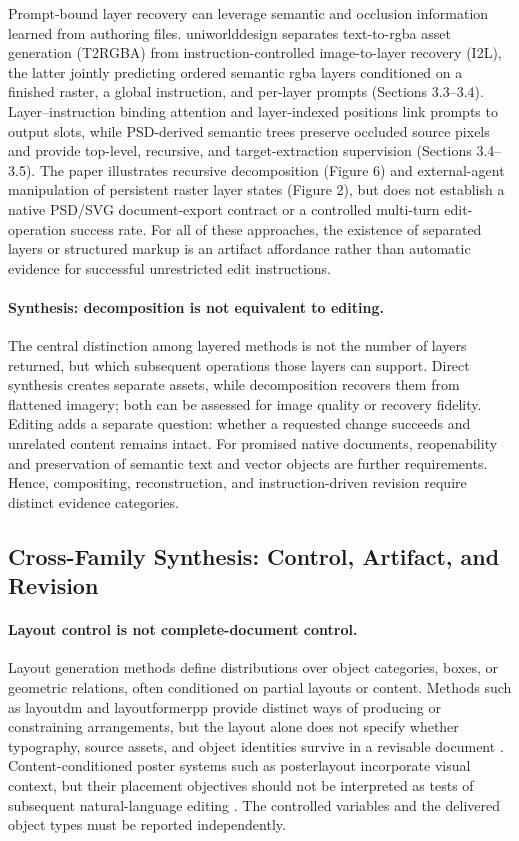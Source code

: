 Prompt-bound layer recovery can leverage semantic and occlusion information learned from authoring files.
\ac{uniworlddesign} separates text-to-\ac{rgba} asset generation (T2RGBA) from instruction-controlled image-to-layer recovery (I2L), the latter jointly predicting ordered semantic \ac{rgba} layers conditioned on a finished raster, a global instruction, and per-layer prompts (Sections 3.3--3.4).
Layer--instruction binding attention and layer-indexed positions link prompts to output slots, while PSD-derived semantic trees preserve occluded source pixels and provide top-level, recursive, and target-extraction supervision (Sections 3.4--3.5).
The paper illustrates recursive decomposition (Figure 6) and external-agent manipulation of persistent raster layer states (Figure 2), but does not establish a native PSD/SVG document-export contract or a controlled multi-turn edit-operation success rate.
For all of these approaches, the existence of separated layers or structured markup is an artifact affordance rather than automatic evidence for successful unrestricted edit instructions.

\paragraph{Synthesis: decomposition is not equivalent to editing.}
The central distinction among layered methods is not the number of layers returned, but which subsequent operations those layers can support.
Direct synthesis creates separate assets, while decomposition recovers them from flattened imagery; both can be assessed for image quality or recovery fidelity.
Editing adds a separate question: whether a requested change succeeds and unrelated content remains intact.
For promised native documents, reopenability and preservation of semantic text and vector objects are further requirements.
Hence, compositing, reconstruction, and instruction-driven revision require distinct evidence categories.

\subsection{Cross-Family Synthesis: Control, Artifact, and Revision}
\paragraph{Layout control is not complete-document control.}
Layout generation methods define distributions over object categories, boxes, or geometric relations, often conditioned on partial layouts or content.
Methods such as \ac{layoutdm} and \ac{layoutformerpp} provide distinct ways of producing or constraining arrangements, but the layout alone does not specify whether typography, source assets, and object identities survive in a revisable document \citep{layoutdm2023}.
Content-conditioned poster systems such as \ac{posterlayout} incorporate visual context, but their placement objectives should not be interpreted as tests of subsequent natural-language editing \citep{posterlayout2023}.
The controlled variables and the delivered object types must be reported independently.

